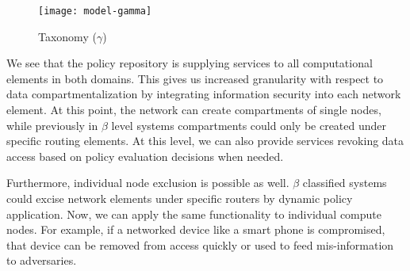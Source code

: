 \begin{figure}[!t]
\centering
\texttt{[image: model-gamma]}
\caption{Taxonomy ($\gamma$)}
\label{fig:model:taxonomy-gamma}
\end{figure}

We see that the policy repository is supplying services to all computational elements in both domains.  This gives us increased granularity with respect to data compartmentalization by integrating information security into each network element.  At this point, the network can create compartments of single nodes, while previously in $\beta$ level systems compartments could only be created under specific routing elements.  At this level, we can also provide services revoking data access based on policy evaluation decisions when needed.

Furthermore, individual node exclusion is possible as well. $\beta$ classified systems could excise network elements under specific routers by dynamic policy application.  Now, we can apply the same functionality to individual compute nodes.  For example, if a networked device like a smart phone is compromised, that device can be removed from access quickly or used to feed mis-information to adversaries.